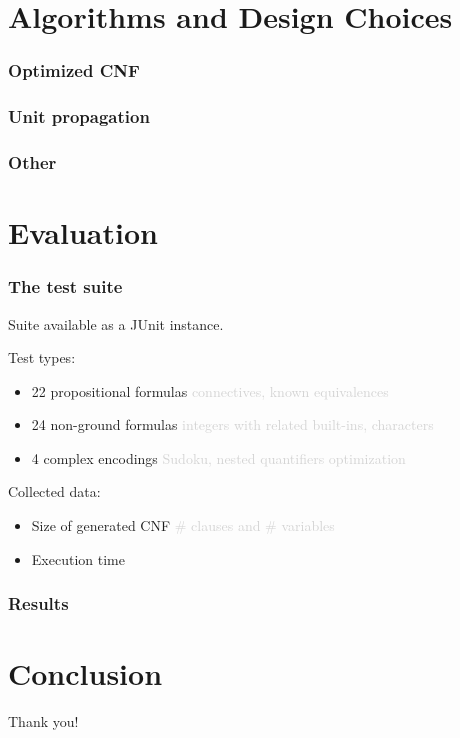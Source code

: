 \documentclass[smaller,dvipsnames]{beamer}
\begin{document}

  \section{Algorithms and Design Choices}

  \begin{frame}
    \frametitle{Optimized CNF}
  \end{frame}

  \begin{frame}
    \frametitle{Unit propagation}
  \end{frame}

  \begin{frame}
    \frametitle{Other}
  \end{frame}

  \section{Evaluation}

  \begin{frame}
    \frametitle{The test suite}
    Suite available as a \alert{JUnit} instance.

    Test types:
    \begin{itemize}
      \item 22 propositional formulas \textcolor{lightgray}{connectives, known equivalences}
      \item 24 non-ground formulas \textcolor{lightgray}{integers with related built-ins, characters}
      \item 4 complex encodings \textcolor{lightgray}{Sudoku, nested quantifiers optimization}
    \end{itemize}
    Collected data:
    \begin{itemize}
      \item \alert{Size} of generated CNF \textcolor{lightgray}{\# clauses and \# variables}
      \item Execution \alert{time}
    \end{itemize}
  \end{frame}

  \begin{frame}
    \frametitle{Results}
  \end{frame}

  \section{Conclusion}


  \begin{frame}[standout]
    Thank you!
  \end{frame}
\end{document}
